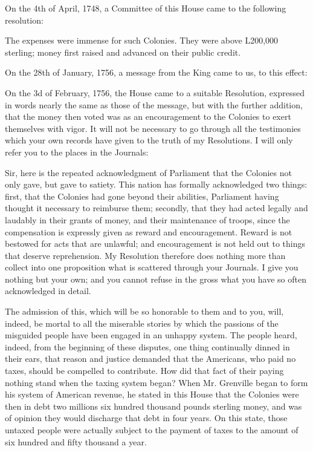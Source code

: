 On the 4th of April, 1748, a Committee of this House came to the following resolution:\par

The expenses were immense for such Colonies. They were above L200,000 sterling; money first raised and advanced on their public credit.\par

On the 28th of January, 1756, a message from the King came to us, to this effect:\par

On the 3d of February, 1756, the House came to a suitable Resolution, expressed in words nearly the same as those of the message, but with the further addition, that the money then voted was as an encouragement to the Colonies to exert themselves with vigor. It will not be necessary to go through all the testimonies which your own records have given to the truth of my Resolutions. I will only refer you to the places in the Journals:\par

Sir, here is the repeated acknowledgment of Parliament that the Colonies not only gave, but gave to satiety. This nation has formally acknowledged two things: first, that the Colonies had gone beyond their abilities, Parliament having thought it necessary to reimburse them; secondly, that they had acted legally and laudably in their grants of money, and their maintenance of troops, since the compensation is expressly given as reward and encouragement. Reward is not bestowed for acts that are unlawful; and encouragement is not held out to things that deserve reprehension. My Resolution therefore does nothing more than collect into one proposition what is scattered through your Journals. I give you nothing but your own; and you cannot refuse in the gross what you have so often acknowledged in detail.\par

The admission of this, which will be so honorable to them and to you, will, indeed, be mortal to all the miserable stories by which the passions of the misguided people have been engaged in an unhappy system. The people heard, indeed, from the beginning of these disputes, one thing continually dinned in their ears, that reason and justice demanded that the Americans, who paid no taxes, should be compelled to contribute. How did that fact of their paying nothing stand when the taxing system began? When Mr. Grenville began to form his system of American revenue, he stated in this House that the Colonies were then in debt two millions six hundred thousand pounds sterling money, and was of opinion they would discharge that debt in four years. On this state, those untaxed people were actually subject to the payment of taxes to the amount of six hundred and fifty thousand a year.\par

